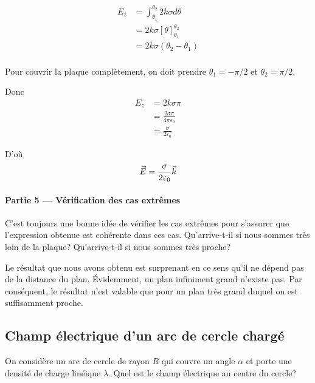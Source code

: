 \begin{align*}
  E_z &= \int_{\theta_1}^{\theta_2} 2k \sigma d\theta \\
      &= 2k \sigma \left[\theta\right]_{\theta_1}^{\theta_2} \\
      &= 2k \sigma \left(\theta_2 - \theta_1 \right) \\
\end{align*}

Pour couvrir la plaque complètement, on doit prendre $\theta_1 = -\pi/2$ et
$\theta_2 = \pi/2$.

Donc
\begin{align*}
  E_z &= 2k \sigma \pi \\
      &= \frac{2 \sigma \pi}{4\pi\varepsilon_0} \\
      &= \frac{\sigma}{2\varepsilon_0}
\end{align*}

D'où
$$\vec{E} = \frac{\sigma}{2\varepsilon_0} \vec{k}$$


\paragraph{Partie 5 --- Vérification des cas extrêmes}

C'est toujours une bonne idée de vérifier les cas extrêmes pour s'assurer que
l'expression obtenue est cohérente dans ces cas. Qu'arrive-t-il si nous sommes
très loin de la plaque? Qu'arrive-t-il si nous sommes très proche?

Le résultat que nous avons obtenu est surprenant en ce sens qu'il ne dépend pas
de la distance du plan. Évidemment, un plan infiniment grand n'existe pas. Par
conséquent, le résultat n'est valable que pour un plan très grand duquel on est
suffisamment proche.


\subsection*{Champ électrique d'un arc de cercle chargé}

On considère un arc de cercle de rayon $R$ qui couvre un angle $\alpha$ et
porte une densité de charge linéique $\lambda$.  Quel est le champ électrique
au centre du cercle?

